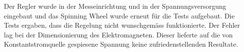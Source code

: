 \newpara
Der Regler wurde in der Messeinrichtung und in der Spannungsversorgung eingebaut und das Spinning Wheel wurde erneut für die Tests aufgebaut. Die Tests ergaben, dass die Regelung nicht wunschgemäss funktionierte. Der Fehler lag bei der Dimensionierung des Elektromagneten. Dieser lieferte auf die von Konstantstromquelle gespiesene Spannung keine zufriedenstellenden Resultate.